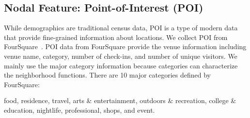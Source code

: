 

\subsection{Nodal Feature: Point-of-Interest (POI)}

While demographics are traditional census data, POI is a type of  modern data that provide fine-grained information about locations. We collect POI from FourSquare~\cite{poi-data}. POI data from FourSquare provide the venue information including venue name, category, number of check-ins, and number of unique visitors. We mainly use the major category information because categories can characterize the neighborhood functions. There are 10 major categories defined by FourSquare:

\textsf{food, residence, travel, arts \& entertainment, outdoors \& recreation, college \& education, nightlife, professional, shops, and event.}


